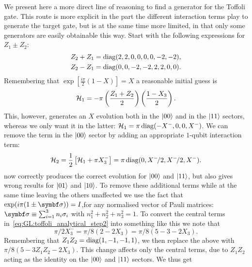 We present here a more direct line of reasoning to find a generator for the Toffoli gate. This route is more explicit in the part the different interaction terms play to generate the target gate, but is at the same time more limited, in that only some generators are easily obtainable this way.
Start with the following expressions for $Z_1 \pm Z_2$:
\begin{equation}
\begin{aligned}
	Z_2 + Z_1 &= \operatorname{diag}(2, 2, 0, 0, 0, 0, -2, -2), \\
	Z_2 - Z_1 &= \operatorname{diag}(0, 0, -2, -2, 2, 2, 0, 0).
\end{aligned}
\end{equation}
Remembering that
$\exp\left[\frac{i\pi}{2}(1-X)\right] = X$ a reasonable initial guess is
\begin{equation}
	{\mathcal{H}}_1 = - \pi \left(\frac{Z_1+Z_2}{2}\right)\left(\frac{1-X_3}{2}\right).
\end{equation}
This, however, generates an $X$ evolution both in the $\ket{00}$ and in the $\ket{11}$ sectors, whereas we only want it in the latter:
${\mathcal{H}}_1 = \pi\operatorname{diag}(-X^-, 0, 0, X^-)$.
We can remove the term in the $\ket{00}$ sector by adding an appropriate $1$-qubit interaction term:
\begin{equation}
	{\mathcal{H}}_2 = \frac{1}{2} \left[ {\mathcal{H}}_1 + \pi X_3^- \right] =
    \pi \operatorname{diag}(0, X^-\!/2, X^-\!/2, X^-).
\label{eq:GL:toffoli_analytical_step2}
\end{equation}
 now correctly produces the correct evolution for $\ket{00}$ and $\ket{11}$, but also gives wrong results for $\ket{01}$ and $\ket{10}$.
To remove these additional terms while at the same time leaving the others unaffected we use the fact that $\exp(i\pi (1 \pm \bs{\sigma})) = I$,for any normalised vector of Pauli matrices: $\bs\sigma \equiv \sum_{i=1}^3 n_i \sigma_i$ with $n_1^2 + n_2^2 + n_3^2 = 1$.
To convert the central terms in~\cref{eq:GL:toffoli_analytical_step2} into something like this we note that
\begin{equation}
	\pi/2 X^-_3 = \pi/8(2 - 2 X_3) = \pi/8(5 - 3 - 2 X_3).
\end{equation}
Remembering that $Z_1 Z_2 = \operatorname{diag}(1, -1, -1, 1)$, we then replace the above with
$\pi/8(5 - 3Z_1 Z_2 - 2X_3)$.
This change affects only the central terms, due to $Z_1 Z_2$ acting as the identity on the $\ket{00}$ and $\ket{11}$ sectors. We thus get
